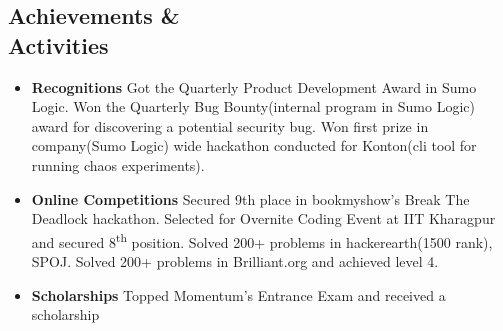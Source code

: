 \documentclass[margin,line]{resume}
\begin{document}
\begin{resume}
\section{\mysidestyle Achievements \& \\ Activities}
\vspace{0mm}
    \begin{itemize}
            \item \textbf{Recognitions} \vspace{0mm}
                \subitem Got the Quarterly Product Development Award in Sumo Logic.
                \subitem Won the Quarterly Bug Bounty(internal program in Sumo Logic) award for discovering a potential security bug.
                \subitem Won first prize in company(Sumo Logic) wide hackathon conducted for Konton(cli tool for running chaos experiments).
            \item \textbf{Online Competitions} \vspace{0mm}
                \subitem Secured 9th place in bookmyshow's Break The Deadlock hackathon.
                \subitem Selected for Overnite Coding Event at IIT Kharagpur and secured 8​\textsuperscript{th}​ position.
                \subitem Solved 200+ problems in hackerearth(1500 rank), SPOJ.
                \subitem Solved 200+ problems in Brilliant.org and achieved level 4.
            \item \textbf{Scholarships} \vspace{0mm}
                \subitem Topped Momentum's Entrance Exam and received a  scholarship
            
    \end{itemize}




\end{resume}
\end{document}
